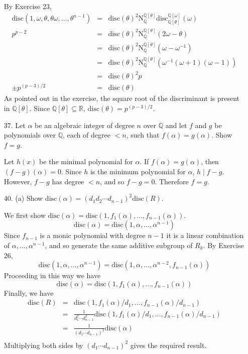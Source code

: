 \documentclass{article}
\newcommand{\w}[0]{\omega}
\newcommand{\Q}[0]{\mathbb{Q}}
\newcommand{\R}[0]{\mathbb{R}}
\newcommand{\disc}[1]{\text{disc}(#1)}
\begin{document}
\begin{enumerate}
By Exercise 23,
\begin{eqnarray*}
\disc{1, \w, \theta, \theta\w, \ldots, \theta^{n-1}} &=&
    \disc{\theta}^2 \text{N}^{\Q[\theta]}_{\Q} \text{disc}^{\Q[\w]}_{\Q[\theta]}(\w) \\
    p^{p - 2} &=& \disc{\theta}^2 \text{N}^{\Q[\theta]}_{\Q} (2\w - \theta) \\
    &=& \disc{\theta}^2 \text{N}^{\Q[\theta]}_{\Q} (\w - \w^{-1}) \\
    &=& \disc{\theta}^2 \text{N}^{\Q[\theta]}_{\Q} (\w^{-1}(\w + 1 )(\w - 1))\\
    &=& \disc{\theta}^2 p\\
    \pm p^{(p - 3)/2} &=& \disc{\theta}
\end{eqnarray*}
As pointed out in the exercise, the square root of the discriminant is present in $\Q[\theta]$.  Since $\Q[\theta] \subseteq \R$, $\disc{\theta} = p^{(p-3)/2}$.

\item[37.] Let $\alpha$ be an algebraic integer of degree $n$ over $\Q$ and let $f$ and $g$ be polynomials over $\Q$, each of degree $< n$, such that $f(\alpha) = g(\alpha)$.  Show $f = g$.

Let $h(x)$ be the minimal polynomial for $\alpha$.  If $f(\alpha) = g(\alpha)$, then $(f - g)(\alpha) = 0$.  Since $h$ is the minimum polynomial for $\alpha$, $h \mid f - g$.  However, $f - g$ has degree $< n$, and so $f - g = 0$.  Therefore $f = g$.

\item[40. (a)] Show $\disc{\alpha} = (d_1 d_2 \cdots d_{n-1})^2 \disc{R}$.

We first show $\disc{\alpha} = \disc{1, f_1(\alpha), \ldots, f_{n-1}(\alpha)}$.  \[ \disc{\alpha} = \disc{1, \alpha, \ldots, \alpha^{n-1}} \]  Since $f_{n-1}$ is a monic polynomial with degree $n-1$ it is a linear combination of $\alpha, \ldots, \alpha^{n-1}$, and so generate the same additive subgroup of $R_{k}$.  By Exercise 26, \[ \disc{1, \alpha, \ldots, \alpha^{n-1}} = \disc{1, \alpha, \ldots, \alpha^{n-2}, f_{n-1}(\alpha)} \]  Proceeding in this way we have \[ \disc{\alpha} = \disc{1, f_1(\alpha), \ldots, f_{n-1}(\alpha)} \]
Finally, we have
\begin{eqnarray*}
    \disc{R} &=& \disc{1, f_1(\alpha)/d_1, \ldots, f_{n-1}(\alpha)/d_{n-1}} \\
    &=& \frac{1}{d_1^2 \cdots d_{n-1}^2} \disc{1, f_1(\alpha)/d_1, \ldots, f_{n-1}(\alpha)/d_{n-1}} \\
    &=& \frac{1}{(d_1 \cdots d_{n-1})^2} \disc{\alpha} \\
\end{eqnarray*}
Multiplying both sides by $(d_1 \cdots d_{n-1})^2$ gives the required result.


\end{enumerate}
\end{document}
